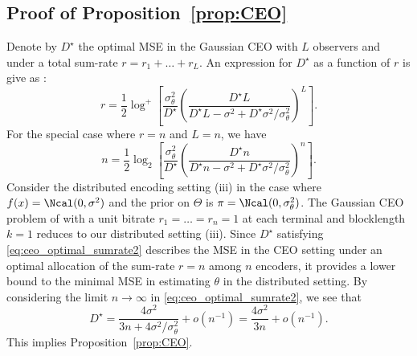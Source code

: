 \subsection{Proof of Proposition~\ref{prop:CEO}
\label{app:proof:CEO}}

%
Denote by $D^\star$ the optimal MSE in the Gaussian CEO with $L$ observers and under a total sum-rate $r = r_1 + \ldots +r_L$. An expression for $D^\star$ as a function of $r$ is give as \cite[Eq. 10]{chen2004upper}:
\begin{equation} \label{eq:ceo_optimal_sumrate}
r = \frac{1}{2} \log^+ \left[ \frac{\sigma_\theta^2}{D^\star} \left( \frac{D^\star L}{ D^\star L - \sigma^2 + D^\star \sigma^2 / \sigma_\theta^2 }\right)^L  \right].
\end{equation}
For the special case where $r = n$ and $L=n$, we have
\begin{equation} \label{eq:ceo_optimal_sumrate2}
n = \frac{1}{2} \log_2 \left[ \frac{\sigma_\theta^2}{D^\star} \left(\frac{ D^\star n }{D^\star n - \sigma^2 + D^\star \sigma^2/\sigma_\theta^2 }  \right)^n  \right].
\end{equation}
Consider the distributed encoding setting (iii) in the case where $f(x) = \Ncal(0,\sigma^2)$ and the prior on $\Theta$ is $\pi = \Ncal(0,\sigma_\theta^2)$. The Gaussian CEO problem of \cite{viswanathan1997quadratic} with a unit bitrate $r_1=\ldots = r_n =1$ at each terminal and blocklength $k=1$ reduces to our distributed setting (iii). Since $D^\star$ satisfying \eqref{eq:ceo_optimal_sumrate2} describes the MSE in the CEO setting under an optimal allocation of the sum-rate $r = n$ among $n$ encoders, it provides a lower bound to the minimal MSE in estimating $\theta$ in the distributed setting. By considering the limit $n\rightarrow \infty$ in \eqref{eq:ceo_optimal_sumrate2}, we see that 
\[
D^\star = \frac{ 4\sigma^2 }{3n + 4 \sigma^2 / \sigma_\theta^2 } + o(n^{-1}) =  \frac{4\sigma^2}{3n} + o(n^{-1}). 
\]
This implies Proposition~\ref{prop:CEO}. 

